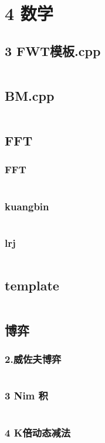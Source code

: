 \documentclass{article}
\begin{document}
\section{4 数学}
\subsection{3 FWT模板.cpp}
\inputminted{c++}{/home/zzuzxy/t3/ACM-template/4 数学/3 FWT模板.cpp}
\subsection{BM.cpp}
\inputminted{c++}{/home/zzuzxy/t3/ACM-template/4 数学/BM.cpp}
\subsection{FFT}
\subsubsection{FFT}
\inputminted{c++}{/home/zzuzxy/t3/ACM-template/4 数学/FFT/FFT.cpp}
\subsubsection{kuangbin}
\inputminted{c++}{/home/zzuzxy/t3/ACM-template/4 数学/FFT/kuangbin.cpp}
\subsubsection{lrj}
\inputminted{c++}{/home/zzuzxy/t3/ACM-template/4 数学/FFT/lrj.cpp}
\subsection{template}
\inputminted{c++}{/home/zzuzxy/t3/ACM-template/4 数学/Lagrange-poly/template.cpp}
\subsection{博弈}
\subsubsection{2.威佐夫博弈}
\inputminted{c++}{/home/zzuzxy/t3/ACM-template/4 数学/博弈/2.威佐夫博弈.cpp}
\subsubsection{3 Nim 积}
\inputminted{c++}{/home/zzuzxy/t3/ACM-template/4 数学/博弈/3 Nim 积.cpp}
\subsubsection{4 K倍动态减法}
\inputminted{c++}{/home/zzuzxy/t3/ACM-template/4 数学/博弈/4 K倍动态减法.cpp}
\end{document}

